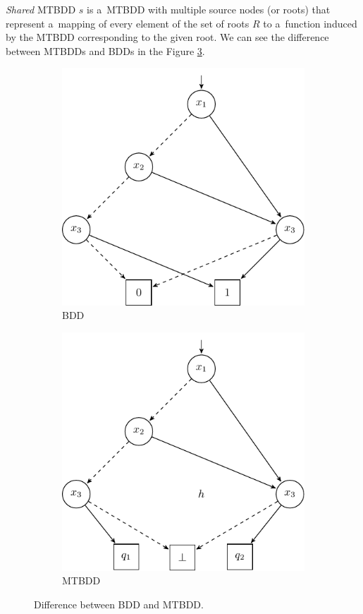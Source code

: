 \emph{Shared} MTBDD $s$ is a~MTBDD with multiple source nodes (or roots) that
represent a~mapping of every element of the set of roots $R$ to a~function
induced by the MTBDD corresponding to the given root. We can see the difference
between MTBDDs and BDDs in the Figure \ref{mtbdd-vs-bdd}.

\begin{figure}
\begin{subfigure}{.5\textwidth}
  \centering
  \includegraphics[width=.8\linewidth]{fig/bdd}
  \caption{BDD}
  \label{BDD}
\end{subfigure}%
\begin{subfigure}{.5\textwidth}
  \centering
  \includegraphics[width=.8\linewidth]{fig/mtbdd}
  \caption{MTBDD}
  \label{MTBDD}
\end{subfigure}
\caption{Difference between BDD and MTBDD.}
\label{mtbdd-vs-bdd}
\end{figure}


